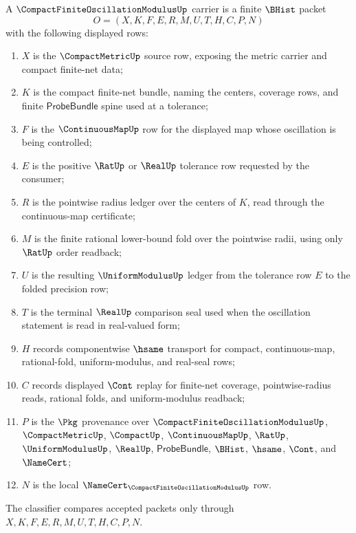 \begin{definition}
\label{def:compact-finite-oscillation-modulus-carrier}
A $\CompactFiniteOscillationModulusUp$ carrier is a finite $\BHist$ packet
$$
O=(X,K,F,E,R,M,U,T,H,C,P,N)
$$
with the following displayed rows:
\begin{enumerate}
\item $X$ is the $\CompactMetricUp$ source row, exposing the metric carrier and compact finite-net data;
\item $K$ is the compact finite-net bundle, naming the centers, coverage rows, and finite $\mathsf{ProbeBundle}$ spine used at a tolerance;
\item $F$ is the $\ContinuousMapUp$ row for the displayed map whose oscillation is being controlled;
\item $E$ is the positive $\RatUp$ or $\RealUp$ tolerance row requested by the consumer;
\item $R$ is the pointwise radius ledger over the centers of $K$, read through the continuous-map certificate;
\item $M$ is the finite rational lower-bound fold over the pointwise radii, using only $\RatUp$ order readback;
\item $U$ is the resulting $\UniformModulusUp$ ledger from the tolerance row $E$ to the folded precision row;
\item $T$ is the terminal $\RealUp$ comparison seal used when the oscillation statement is read in real-valued form;
\item $H$ records componentwise $\hsame$ transport for compact, continuous-map, rational-fold, uniform-modulus, and real-seal rows;
\item $C$ records displayed $\Cont$ replay for finite-net coverage, pointwise-radius reads, rational folds, and uniform-modulus readback;
\item $P$ is the $\Pkg$ provenance over $\CompactFiniteOscillationModulusUp$, $\CompactMetricUp$, $\CompactUp$, $\ContinuousMapUp$, $\RatUp$, $\UniformModulusUp$, $\RealUp$, $\mathsf{ProbeBundle}$, $\BHist$, $\hsame$, $\Cont$, and $\NameCert$;
\item $N$ is the local $\NameCert_{\CompactFiniteOscillationModulusUp}$ row.
\end{enumerate}
The classifier compares accepted packets only through $X,K,F,E,R,M,U,T,H,C,P,N$.
\end{definition}

